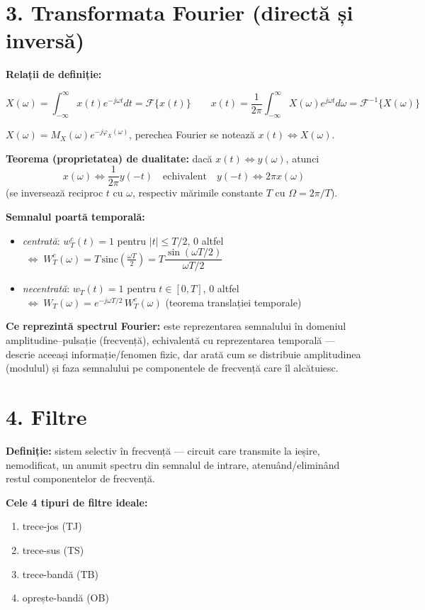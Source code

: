 \documentclass[10pt,a4paper]{article}
\begin{document}
\section*{3. Transformata Fourier (directă și inversă)}
\textbf{Relații de definiție:}
\begin{keyeq}\color{red!65!black}
$$X(\omega)=\int_{-\infty}^{\infty}x(t)e^{-j\omega t}dt=\mathcal{F}\{x(t)\} \qquad x(t)=\frac{1}{2\pi}\int_{-\infty}^{\infty}X(\omega)e^{j\omega t}d\omega=\mathcal{F}^{-1}\{X(\omega)\}$$
\end{keyeq}
$X(\omega)=M_X(\omega)e^{-j\varphi_X(\omega)}$, perechea Fourier se notează $x(t)\Leftrightarrow X(\omega)$.

\textbf{Teorema (proprietatea) de dualitate:} dacă $x(t)\Leftrightarrow y(\omega)$, atunci
$$x(\omega)\Leftrightarrow \frac{1}{2\pi}y(-t) \quad\text{echivalent}\quad y(-t)\Leftrightarrow 2\pi x(\omega)$$
(se inversează reciproc $t$ cu $\omega$, respectiv mărimile constante $T$ cu $\Omega=2\pi/T$).

\textbf{Semnalul poartă temporală:}
\begin{itemize}
\item \emph{centrată}: $w_T^c(t)=1$ pentru $|t|\le T/2$, $0$ altfel $\;\Leftrightarrow\; W_T^c(\omega)=T\,\mathrm{sinc}\!\left(\frac{\omega T}{2}\right)=T\dfrac{\sin(\omega T/2)}{\omega T/2}$
\item \emph{necentrată}: $w_T(t)=1$ pentru $t\in[0,T]$, $0$ altfel $\;\Leftrightarrow\; W_T(\omega)=e^{-j\omega T/2}\,W_T^c(\omega)$ (teorema translației temporale)
\end{itemize}

\textbf{Ce reprezintă spectrul Fourier:} este reprezentarea semnalului în domeniul amplitudine–pulsație (frecvență), echivalentă cu reprezentarea temporală — descrie aceeași informație/fenomen fizic, dar arată cum se distribuie amplitudinea (modulul) și faza semnalului pe componentele de frecvență care îl alcătuiesc.

\section*{4. Filtre}
\textbf{Definiție:} sistem selectiv în frecvență — circuit care transmite la ieșire, nemodificat, un anumit spectru din semnalul de intrare, atenuând/eliminând restul componentelor de frecvență.

\textbf{Cele 4 tipuri de filtre ideale:}
\begin{enumerate}
\item trece-jos (TJ)
\item trece-sus (TS)
\item trece-bandă (TB)
\item oprește-bandă (OB)
\end{enumerate}
\end{document}
